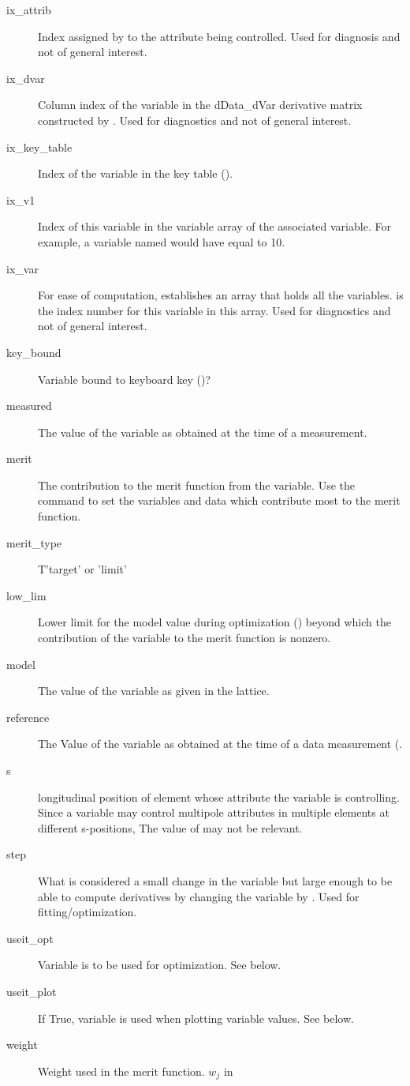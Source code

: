 \begin{description}
  \item[ix_attrib] \Newline
Index assigned by \bmad to the attribute being controlled. Used for diagnosis and not
of general interest.
  \item[ix_dvar] \Newline
Column index of the variable in the dData_dVar derivative matrix constructed by \tao.
Used for diagnostics and not of general interest.
  \item[ix_key_table] \Newline
Index of the variable in the key table ().
  \item[ix_v1] \Newline
Index of this variable in the variable array of the associated  variable.
For example, a variable named  would have  equal to 10.
  \item[ix_var] \Newline
For ease of computation, \tao establishes an array that holds all the variables.
 is the index number for this variable in this array. 
Used for diagnostics and not of general interest.
  \item[key_bound] \Newline
Variable bound to keyboard key ()?
  \item[measured] \Newline
The value of the variable as obtained at the time of a  measurement.
  \item[merit] \Newline
The contribution to the merit function  from the variable. Use the 
command to set the variables and data which contribute most to the merit function.
  \item[merit_type] \Newline
T'target' or 'limit'
  \item[low_lim] \Newline
Lower limit for the model value during optimization () beyond which
the contribution of the variable to the merit function is nonzero.
  \item[model] \Newline
The value of the variable as given in the  lattice.
  \item[reference] \Newline
The Value of the variable as obtained at the time of a  data measurement
(.
  \item[s] \Newline
longitudinal position of element whose attribute the variable is controlling.  Since a
variable may control multipole attributes in multiple elements at different s-positions,
The value of  may not be relevant.
  \item[step] \Newline
What is considered a small change in the variable but large enough to be able to compute
derivatives by changing the variable by . Used for fitting/optimization.  
  \item[useit_opt] \Newline
Variable is to be used for optimization. See below.
  \item[useit_plot] \Newline
If True, variable is used when plotting variable values. See below.
  \item[weight] \Newline
Weight used in the merit function. $w_j$ in 
  \end{description}


